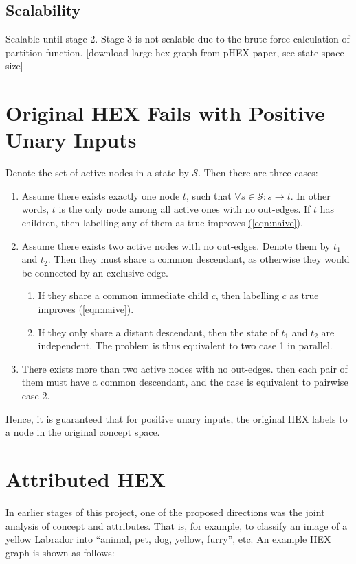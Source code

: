 \documentclass[11pt,a4paper]{article}
\begin{document}
\subsection{Scalability}

Scalable until stage 2. Stage 3 is not scalable due to the brute force calculation of partition function. [download large hex graph from pHEX paper, see state space size]

\clearpage
\appendix
\section{Original HEX Fails with Positive Unary Inputs}
\label{sec:fail}

Denote the set of active nodes in a state by $\mathcal{S}$. Then there are three cases:
\begin{enumerate}
\item Assume there exists exactly one node $t$, such that $\forall s\in\mathcal{S}:s\rightarrow t$. In other words, $t$ is the only node among all active ones with no out-edges. If $t$ has children, then labelling any of them as true improves \hyperref[eqn:naive]{(\ref{eqn:naive})}.
\item Assume there exists two active nodes with no out-edges. Denote them by $t_1$ and $t_2$. Then they must share a common descendant, as otherwise they would be connected by an exclusive edge.
\begin{enumerate}
\item If they share a common immediate child $c$, then labelling $c$ as true improves \hyperref[eqn:naive]{(\ref{eqn:naive})}.
\item If they only share a distant descendant, then the state of $t_1$ and $t_2$ are independent. The problem is thus equivalent to two case 1 in parallel.
\end{enumerate}
\item There exists more than two active nodes with no out-edges. then each pair of them must have a common descendant, and the case is equivalent to pairwise case 2.
\end{enumerate}
Hence, it is guaranteed that for positive unary inputs, the original HEX labels to a node in the original concept space.

\section{Attributed HEX}

In earlier stages of this project, one of the proposed directions was the joint analysis of concept and attributes. That is, for example, to classify an image of a yellow Labrador into ``animal, pet, dog, yellow, furry'', etc. An example HEX graph is shown as follows:
\end{document}
